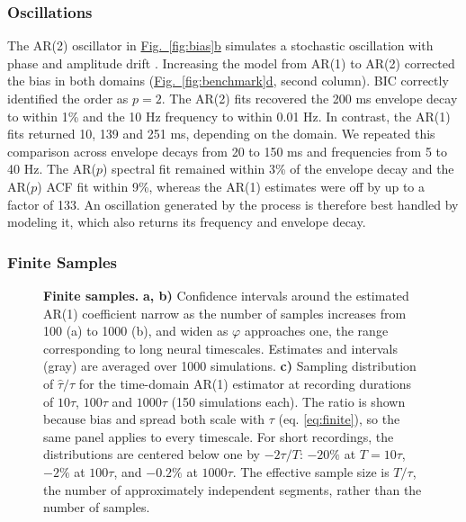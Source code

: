 \documentclass[pdflatex,sn-mathphys-num]{sn-jnl}
\newcommand{\figpanel}[2]{\hyperref[#1]{Fig.~\ref*{#1}#2}}
\begin{document}
\subsubsection{Oscillations}\label{sec:osc}

The AR(2) oscillator in \figpanel{fig:bias}{b} simulates a stochastic oscillation with phase and amplitude drift \cite{stralrowski_charts_1970, feingold_bursts_2015}. Increasing the model from AR(1) to AR(2) corrected the bias in both domains (\figpanel{fig:benchmark}{d}, second column). BIC correctly identified the order as $p=2$. The AR(2) fits recovered the 200 ms envelope decay to within 1\% and the 10 Hz frequency to within 0.01 Hz. In contrast, the AR(1) fits returned 10, 139 and 251 ms, depending on the domain. We repeated this comparison across envelope decays from 20 to 150 ms and frequencies from 5 to 40 Hz. The AR($p$) spectral fit remained within 3\% of the envelope decay and the AR($p$) ACF fit within 9\%, whereas the AR(1) estimates were off by up to a factor of 133. An oscillation generated by the process is therefore best handled by modeling it, which also returns its frequency and envelope decay.

\subsubsection{Finite Samples}\label{sec:finite}

\begin{figure}[htbp]
\centering

\caption{\textbf{Finite samples.} \textbf{a, b)} Confidence intervals around the estimated AR(1) coefficient narrow as the number of samples increases from 100 (a) to 1000 (b), and widen as $\varphi$ approaches one, the range corresponding to long neural timescales. Estimates and intervals (gray) are averaged over 1000 simulations. \textbf{c)} Sampling distribution of $\hat\tau/\tau$ for the time-domain AR(1) estimator at recording durations of $10\tau$, $100\tau$ and $1000\tau$ (150 simulations each). The ratio is shown because bias and spread both scale with $\tau$ (eq. \ref{eq:finite}), so the same panel applies to every timescale. For short recordings, the distributions are centered below one by $-2\tau/T$: $-20\%$ at $T = 10\tau$, $-2\%$ at $100\tau$, and $-0.2\%$ at $1000\tau$. The effective sample size is $T/\tau$, the number of approximately independent segments, rather than the number of samples.}
\label{fig:finite}
\end{figure}
\end{document}
